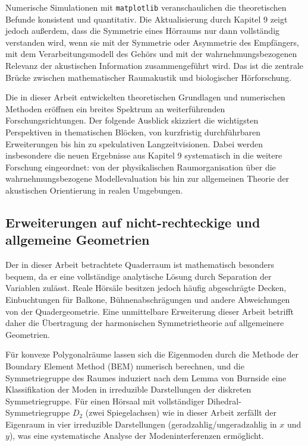 ﻿\documentclass[12pt, a4paper]{article}
\theoremstyle{definition}
\theoremstyle{remark}
\begin{document}
Numerische Simulationen mit \texttt{matplotlib} veranschaulichen die theoretischen
Befunde konsistent und quantitativ. Die Aktualisierung durch Kapitel 9 zeigt
jedoch außerdem, dass die Symmetrie eines Hörraums nur dann vollständig verstanden
wird, wenn sie mit der Symmetrie oder Asymmetrie des Empfängers, mit dem
Verarbeitungsmodell des Gehörs und mit der wahrnehmungsbezogenen Relevanz der
akustischen Information zusammengeführt wird. Das ist die zentrale Brücke zwischen
mathematischer Raumakustik und biologischer Hörforschung.

Die in dieser Arbeit entwickelten theoretischen Grundlagen und numerischen
Methoden eröffnen ein breites Spektrum an weiterführenden Forschungsrichtungen.
Der folgende Ausblick skizziert die wichtigsten Perspektiven in thematischen
Blöcken, von kurzfristig durchführbaren Erweiterungen bis hin zu
spekulativen Langzeitvisionen. Dabei werden insbesondere die neuen Ergebnisse aus
Kapitel 9 systematisch in die weitere Forschung eingeordnet: von der physikalischen
Raumorganisation über die wahrnehmungsbezogene Modellevaluation bis hin zur
allgemeinen Theorie der akustischen Orientierung in realen Umgebungen.

\subsection{Erweiterungen auf nicht-rechteckige und allgemeine Geometrien}

Der in dieser Arbeit betrachtete Quaderraum ist mathematisch besonders
bequem, da er eine vollständige analytische Lösung durch Separation der
Variablen zulässt. Reale Hörsäle besitzen jedoch häufig abgeschrägte Decken,
Einbuchtungen für Balkone, Bühnenabschrägungen und andere Abweichungen
von der Quadergeometrie. Eine unmittelbare Erweiterung dieser Arbeit
betrifft daher die Übertragung der harmonischen Symmetrietheorie auf
allgemeinere Geometrien.

Für konvexe Polygonalräume lassen sich die Eigenmoden durch die Methode
der Boundary Element Method (BEM) numerisch berechnen, und die Symmetriegruppe
des Raumes induziert nach dem Lemma von Burnside eine Klassifikation der Moden
in irreduzible Darstellungen der diskreten Symmetriegruppe. Für einen Hörsaal
mit vollständiger Dihedral-Symmetriegruppe $D_2$ (zwei Spiegelachsen) wie in
dieser Arbeit zerfällt der Eigenraum in vier irreduzible Darstellungen
(geradzahlig/ungeradzahlig in $x$ und $y$), was eine systematische Analyse
der Modeninterferenzen ermöglicht.
\end{document}
